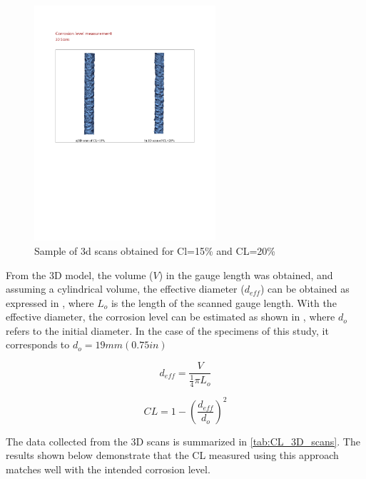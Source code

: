 \begin{figure}[htbp]
	\centering
	\includegraphics[width=0.6\textwidth]{VAC Thesis 2.0/Chapter-4/figs/3dScans_sample.pdf}
	\caption{Sample of 3d scans obtained for Cl=15\% and CL=20\%}
    \label{fig:3D_scans_sample}
\end{figure}

From the 3D model, the volume ($V$) in the gauge length was obtained, and assuming a cylindrical volume, the effective diameter ($d_{eff}$) can be obtained as expressed in , where $L_{o}$ is the length of the scanned gauge length. With the effective diameter, the corrosion level can be estimated as shown in , where $d_{o}$ refers to the initial diameter. In the case of the specimens of this study, it corresponds to  $d_{o}=19mm (0.75 in)$

\begin{equation}
    d_{eff}=\frac{V}{\frac{1}{4}\pi L_{o}}
    \label{eq:eff_diameter}
\end{equation}

\begin{equation}
    CL=1-(\frac{d_{eff}}{d_{o}})^2
    \label{eq:CL_diameter}
\end{equation}

The data collected from the 3D scans is summarized in \ref{tab:CL_3D_scans}. The results shown below demonstrate that the CL measured using this approach matches well with the intended corrosion level.

